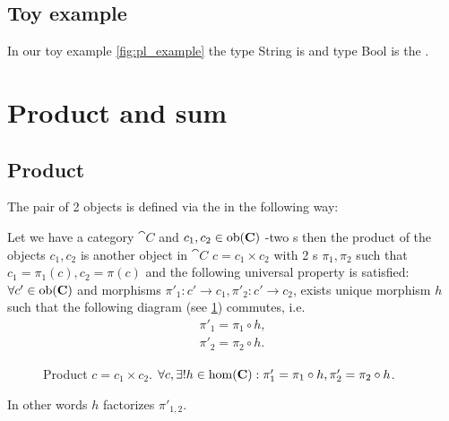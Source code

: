 \subsection{Toy example}

\begin{example}
In our toy example \cref{fig:pl_example} the type String is
 and type Bool is the
.
\end{example}

\section{Product and sum}
\label{sec:product_and_sum}
\subsection{Product}
The pair of 2 objects is defined via the  in
the following way:
\begin{definition}[Product]
\label{def:product}
Let we have a category $\cat{C}$ and $c_1, c_2 \in \mathrm{ob}(\mathbf{C})$ -two
s then the product of the objects $c_1, c_2$ is
another object in $\cat{C}$ $c = c_1 \times c_2$ with 2
s $\pi_1, \pi_2$ such that $c_1 = \pi_1(c),
c_2 = \pi(c)$ and the  
following universal property is satisfied: $\forall c' \in \mathrm{ob}(\mathbf{C})$
and morphisms $\pi'_1: c' \to c_1, \pi'_2: c' \to c_2$, exists unique
morphism $h$ such that the following diagram (see \cref{fig:product})
commutes, i.e. 
\begin{eqnarray}
\pi'_1 = \pi_1 \circ h, 
\nonumber \\
\pi'_2 = \pi_2 \circ h.
\label{eq:product}
\end{eqnarray}
\begin{figure}[H]
  \centering
  \caption{Product $c = c_1 \times c_2$. $\forall c, \exists! h \in
    \mathrm{hom}(\mathbf{C}): \pi'_1 = \pi_1 \circ h, \pi'_2 = \pi_2 \circ h$.}
  \label{fig:product}
\end{figure}
In other words $h$ factorizes $\pi'_{1,2}$.
\end{definition}

